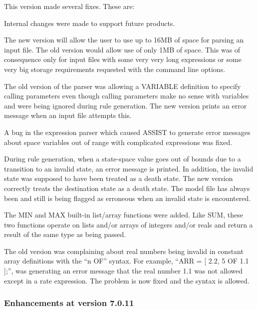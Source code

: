 This version made several fixes.   These are:
\begin{indenteditems}
\item Internal changes were made to support future products.
\item The new version will allow the user to use up to 16MB of space for
      parsing an input file.   The old version would allow use of only
      1MB of space.   This was of consequence only for input files with
      some very very long expressions or some very big storage requirements
      requested with the command line options.
\item The old version of the parser was allowing a VARIABLE definition
      to specify calling parameters even though calling parameters
      make no sense with variables and were being ignored during rule
      generation.   The new version prints an error message when an
      input file attempts this.
\item A bug in the expression parser which caused ASSIST to generate error
      messages about space variables out of range with complicated
      expressions was fixed.
\item During rule generation, when a state-space value goes out of bounds
      due to a transition to an invalid state,
      an error message is printed.   In addition, the invalid state was
      supposed to have been treated as a death state.   The new version
      correctly treats the destination state as a death state.   The
      model file has always been and still is being flagged as erroneous
      when an invalid state is encountered.
\item The MIN and MAX built-in list/array functions were added.   Like SUM,
      these two functions operate on lists and/or arrays of integers and/or
      reals and return a result of the same type as being passed.
\item The old version was complaining about real numbers being invalid
      in constant array definitions with the ``n OF'' syntax.   For example,
      ``ARR = [ 2.2, 5 OF 1.1 ];'', was generating an error message that
      the real number 1.1 was not allowed except in a rate expression.   The
      problem is now fixed and the syntax is allowed.
\end{indenteditems}

\subsubsection{Enhancements at version 7.0.11}

